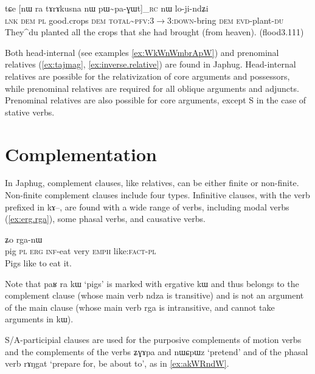 \documentclass[oldfontcommands,oneside,a4paper,11pt]{article}
\newcommand{\ipa}[1]{{\phon#1}} %
\newcommand{\topic}{\textsc{dem}}
\begin{document}
  \begin{exe}
\ex \label{ex:pWpaGWt}
\gll
\ipa{tɕe}  	[\ipa{nɯ} \ipa{ra}  	\ipa{tɤrɤkusna} 	\ipa{nɯ}  	\ipa{pɯ\textasciitilde{}pa-ɣɯt}]_{\textsc{rc}}  	\ipa{nɯ}  	\ipa{lo-ji-ndʑi}  \\
\textsc{lnk} \textsc{dem} \textsc{pl} good.crops \topic{} \textsc{total\textasciitilde{}pfv:3$\rightarrow$3:down}-bring \topic{} \textsc{evd}-plant-\textsc{du} \\
\glt They^{du} planted all the crops that she had brought (from heaven). (flood3.111)
\end{exe}

Both head-internal (see examples \ref{ex:WkWnWmbrApW}) and prenominal relatives (\ref{ex:tajmag}, \ref{ex:inverse.relative}) are found in Japhug. Head-internal relatives are possible for the relativization of core arguments and possessors, while prenominal relatives are required for all oblique arguments and adjuncts. Prenominal relatives are also possible for core arguments, except S in the case of stative verbs.

\section{Complementation}
In Japhug, complement clauses, like relatives, can be either finite or non-finite. Non-finite complement clauses include four types. Infinitive clauses, with the verb prefixed in \ipa{kɤ--}, are found with a wide range of verbs, including modal verbs (\ref{ex:erg.rga}), some phasal verbs, and causative verbs. 


 \begin{exe}
\ex \label{ex:erg.rga}
\gll
[\ipa{paʁ}  	\ipa{ra}  	\ipa{kɯ}  	\ipa{kɤ-ndza}]  	\ipa{wuma}  	\ipa{ʑo}  	\ipa{rga-nɯ}  \\
pig \textsc{pl} \textsc{erg} \textsc{inf}-eat very \textsc{emph}  like:\textsc{fact}-\textsc{pl} \\
 \glt Pigs like to eat it.
\end{exe}

Note that \ipa{paʁ} \ipa{ra} \ipa{kɯ} `pigs' is marked with ergative \ipa{kɯ} and thus belongs to the complement clause (whose main verb \ipa{ndza} is transitive) and is not an argument of the main clause (whose main verb \ipa{rga} is intransitive, and cannot take arguments in \ipa{kɯ}).


S/A-participial clauses are used for the purposive complements of motion verbs and the complements of the verbs \ipa{ʑɣɤpa} and \ipa{nɯɕpɯz} `pretend' and of the phasal verb \ipa{rɤŋgat} `prepare for, be about to', as in \ref{ex:akWRndW}.
\end{document}

